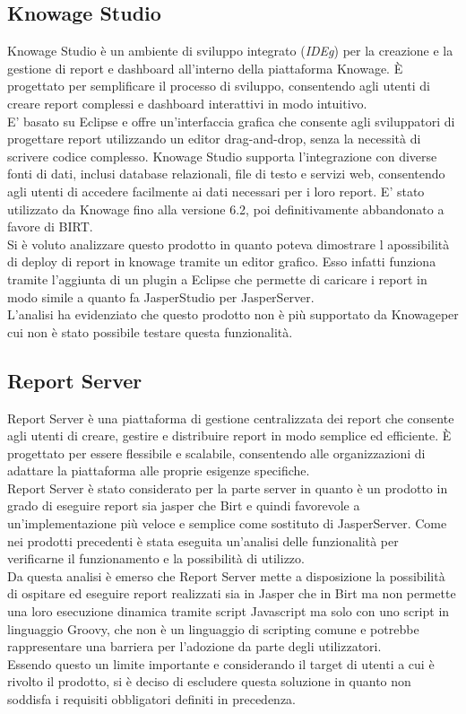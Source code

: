     \subsection{Knowage Studio}
    \label{sec:knowage-studio}
    Knowage Studio è un ambiente di sviluppo integrato (\emph{\gls{IDEg}\glsfirstoccur}) per la creazione e la gestione di report e dashboard all'interno della piattaforma Knowage. È progettato per semplificare il processo di sviluppo, consentendo agli utenti di creare report complessi e dashboard interattivi in modo intuitivo.\\
    E' basato su Eclipse e offre un'interfaccia grafica che consente agli sviluppatori di progettare report utilizzando un editor drag-and-drop, senza la necessità di scrivere codice complesso. Knowage Studio supporta l'integrazione con diverse fonti di dati, inclusi database relazionali, file di testo e servizi web, consentendo agli utenti di accedere facilmente ai dati necessari per i loro report.
    E' stato utilizzato da Knowage fino alla versione 6.2, poi definitivamente abbandonato a favore di BIRT.\\
    Si è voluto analizzare questo prodotto in quanto poteva dimostrare l apossibilità di deploy di report in knowage tramite un editor grafico. Esso infatti funziona tramite l'aggiunta di un plugin a Eclipse che permette di caricare i report in modo simile a quanto fa JasperStudio per JasperServer.\\
    L'analisi ha evidenziato che questo prodotto non è più supportato da Knowageper cui non è stato possibile testare questa funzionalità.

    \subsection{Report Server}
    \label{sec:report-server}
    Report Server è una piattaforma di gestione centralizzata dei report che consente agli utenti di creare, gestire e distribuire report in modo semplice ed efficiente. È progettato per essere flessibile e scalabile, consentendo alle organizzazioni di adattare la piattaforma alle proprie esigenze specifiche.\\
    Report Server è stato considerato per la parte server in quanto è un prodotto in grado di eseguire report sia jasper che Birt e quindi favorevole a un'implementazione più veloce e semplice come sostituto di JasperServer. Come nei prodotti precedenti è stata eseguita un'analisi delle funzionalità per verificarne il funzionamento e la possibilità di utilizzo.\\
    Da questa analisi è emerso che Report Server mette a disposizione la possibilità di ospitare ed eseguire report realizzati sia in Jasper che in Birt ma non permette una loro esecuzione dinamica tramite script Javascript ma solo con uno script in linguaggio Groovy, che non è un linguaggio di scripting comune e potrebbe rappresentare una barriera per l'adozione da parte degli utilizzatori.\\
    Essendo questo un limite importante e considerando il target di utenti a cui è rivolto il prodotto, si è deciso di escludere questa soluzione in quanto non soddisfa i requisiti obbligatori definiti in precedenza.\\

